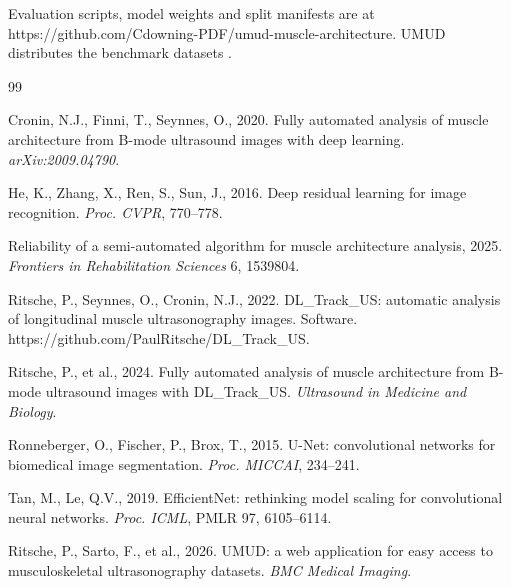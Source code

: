 \documentclass[12pt]{article}
\providecommand{\url}[1]{#1}
\begin{document}
Evaluation scripts, model weights and split manifests are at
\url{https://github.com/Cdowning-PDF/umud-muscle-architecture}. UMUD distributes
the benchmark datasets \citep{umud2024}.

\begin{thebibliography}{99}
\small

Cronin, N.J., Finni, T., Seynnes, O., 2020. Fully automated analysis of muscle
architecture from B-mode ultrasound images with deep learning.
\emph{arXiv:2009.04790}.

He, K., Zhang, X., Ren, S., Sun, J., 2016. Deep residual learning for image
recognition. \emph{Proc. CVPR}, 770--778.

Reliability of a semi-automated algorithm for muscle architecture analysis,
2025. \emph{Frontiers in Rehabilitation Sciences} 6, 1539804.

Ritsche, P., Seynnes, O., Cronin, N.J., 2022. DL\_Track\_US: automatic analysis
of longitudinal muscle ultrasonography images. Software.
\url{https://github.com/PaulRitsche/DL\_Track\_US}.

Ritsche, P., et al., 2024. Fully automated analysis of muscle architecture from
B-mode ultrasound images with DL\_Track\_US. \emph{Ultrasound in Medicine and
Biology}.

Ronneberger, O., Fischer, P., Brox, T., 2015. U-Net: convolutional networks for
biomedical image segmentation. \emph{Proc. MICCAI}, 234--241.

Tan, M., Le, Q.V., 2019. EfficientNet: rethinking model scaling for
convolutional neural networks. \emph{Proc. ICML}, PMLR 97, 6105--6114.

Ritsche, P., Sarto, F., et al., 2026. UMUD: a web application for easy access to
musculoskeletal ultrasonography datasets. \emph{BMC Medical Imaging}.

\end{thebibliography}
\end{document}
